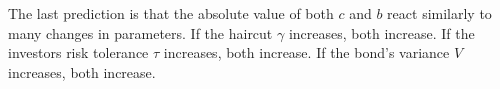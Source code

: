 The last prediction is that the absolute value of both $c$ and $b$ react similarly to many changes in parameters.  If the haircut $\gamma$ increases, both increase.  If the investors risk tolerance $\tau$ increases, both increase.  If the bond's variance $V$ increases, both increase.








